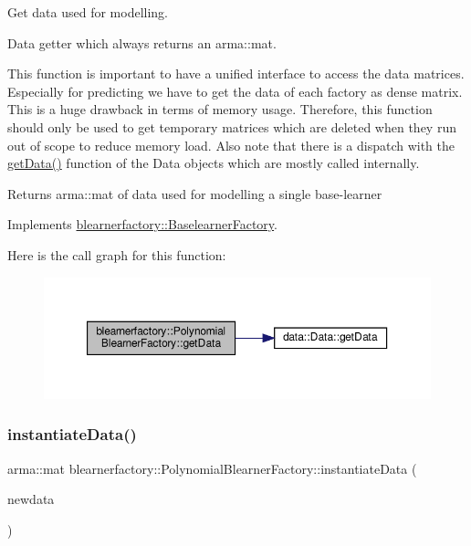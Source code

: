 Get data used for modelling. 

Data getter which always returns an arma\+::mat.

This function is important to have a unified interface to access the data matrices. Especially for predicting we have to get the data of each factory as dense matrix. This is a huge drawback in terms of memory usage. Therefore, this function should only be used to get temporary matrices which are deleted when they run out of scope to reduce memory load. Also note that there is a dispatch with the \mbox{\hyperlink{classblearnerfactory_1_1_polynomial_blearner_factory_addce36fbb590b2cd3d9325b53ae74566}{get\+Data()}} function of the Data objects which are mostly called internally.

\begin{DoxyReturn}{Returns}
{\ttfamily arma\+::mat} of data used for modelling a single base-\/learner 
\end{DoxyReturn}


Implements \mbox{\hyperlink{classblearnerfactory_1_1_baselearner_factory_aa3e4580bca870ca3b742dda6c820e1e6}{blearnerfactory\+::\+Baselearner\+Factory}}.

Here is the call graph for this function\+:\nopagebreak
\begin{figure}[H]
\begin{center}
\leavevmode
\includegraphics[width=350pt]{classblearnerfactory_1_1_polynomial_blearner_factory_addce36fbb590b2cd3d9325b53ae74566_cgraph}
\end{center}
\end{figure}
\mbox{\label{classblearnerfactory_1_1_polynomial_blearner_factory_aeea9c480671ae7cf7d3be470ce0feaef}} 
\subsubsection{\texorpdfstring{instantiate\+Data()}{instantiateData()}}
{\footnotesize\ttfamily arma\+::mat blearnerfactory\+::\+Polynomial\+Blearner\+Factory\+::instantiate\+Data (\begin{DoxyParamCaption}\item[{const arma\+::mat \&}]{newdata }\end{DoxyParamCaption})\hspace{0.3cm}{\ttfamily [virtual]}}



